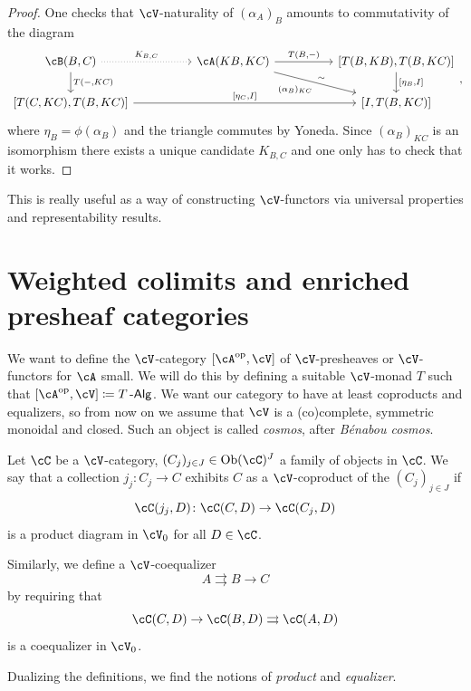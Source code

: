 \documentclass[a4paper,11pt,oneside,openany]{scrbook}
\begin{document}
\begin{proof}
    One checks that $\cV$-naturality of $(\alpha_A)_B$ amounts to commutativity of the diagram
    \[
    \begin{tikzcd}[column sep = 5em]
        \cB(B,C)\ar[r, dotted, "K_{B,C}"]\ar[d, "{T(-,KC)}"]
        & \cA(KB,KC)\ar[r, "{T(B,-)}"]\ar[dr, "\sim"', swap, "{(\alpha_B)_{KC}}"]
        & {[T(B,KB),T(B,KC)]}\ar[d, "{[\eta_B, I]}"] \\
        {[T(C,KC),T(B,KC)]}\ar[rr, "{[\eta_C,I]}"]
        && {[I,T(B,KC)]}
    \end{tikzcd}
    ,\]
    where $\eta_B=\phi(\alpha_B)$ and the triangle commutes by Yoneda. Since $(\alpha_B)_{KC}$ is an isomorphism there exists a unique candidate $K_{B,C}$ and one only has to check that it works.
\end{proof}

\begin{rmk}
    This is really useful as a way of constructing $\cV$-functors via universal properties and representability results.
\end{rmk}

\section{Weighted colimits and enriched presheaf categories}

We want to define the $\cV$-category $[\cA^{\op},\cV]$ of $\cV$-presheaves or $\cV$-functors for $\cA$ small. We will do this by defining a suitable $\cV$-monad $T$ such that $[\cA^{\op},\cV]\coloneqq T\Alg$. We want our category to have at least coproducts and equalizers, so from now on we assume that $\cV$ is a (co)complete, symmetric monoidal and closed. Such an object is called \emph{cosmos}, after \emph{B\'enabou cosmos}.

\begin{defn}
    Let $\cC$ be a $\cV$-category, $(C_j)_{j\in J}\in\Ob(\cC)^J$ a family of objects in $\cC$. We say that a collection $j_j\colon C_j\rightarrow C$ exhibits $C$ as a $\cV$-coproduct of the $(C_j)_{j\in J}$ if$$\cC(j_j,D)\colon\cC(C,D)\rightarrow\cC(C_j,D)$$is a product diagram in $\cV_0$ for all $D\in\cC$.
    
    Similarly, we define a $\cV$-coequalizer$$A\rightrightarrows B\rightarrow C$$ by requiring that $$\cC(C,D)\rightarrow\cC(B,D)\rightrightarrows\cC(A,D)$$is a coequalizer in $\cV_0$.
    
    Dualizing the definitions, we find the notions of \emph{product} and \emph{equalizer}.
\end{defn}
\end{document}
